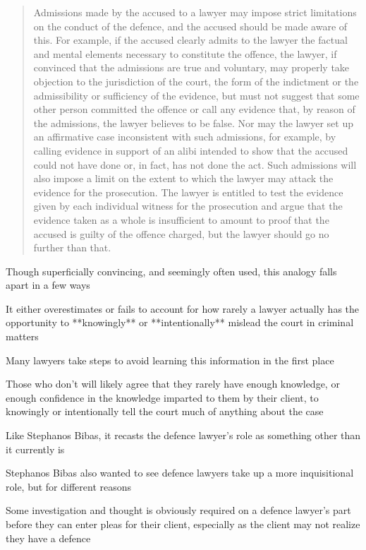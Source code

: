 \begin{quote}
    Admissions made by the accused to a lawyer may impose strict limitations on the conduct of the defence, and the accused should be made aware of this. For example, if the accused clearly admits to the lawyer the factual and mental elements necessary to constitute the offence, the lawyer, if convinced that the admissions are true and voluntary, may properly take objection to the jurisdiction of the court, the form of the indictment or the admissibility or sufficiency of the evidence, but must not suggest that some other person committed the offence or call any evidence that, by reason of the admissions, the lawyer believes to be false. Nor may the lawyer set up an affirmative case inconsistent with such admissions, for example, by calling evidence in support of an alibi intended to show that the accused could not have done or, in fact, has not done the act. Such admissions will also impose a limit on the extent to which the lawyer may attack the evidence for the prosecution. The lawyer is entitled to test the evidence given by each individual witness for the prosecution and argue that the evidence taken as a whole is insufficient to amount to proof that the accused is guilty of the offence charged, but the lawyer should go no further than that.
\end{quote}

Though superficially convincing, and seemingly often used, this analogy falls apart in a few ways

It either overestimates or fails to account for how rarely a lawyer actually has the opportunity to **knowingly** or **intentionally** mislead the court in criminal matters

Many lawyers take steps to avoid learning this information in the first place

Those who don't will likely agree that they rarely have enough knowledge, or enough confidence in the knowledge imparted to them by their client, to knowingly or intentionally tell the court much of anything about the case

Like Stephanos Bibas, it recasts the defence lawyer's role as something other than it currently is

Stephanos Bibas also wanted to see defence lawyers take up a more inquisitional role, but for different reasons

Some investigation and thought is obviously required on a defence lawyer's part before they can enter pleas for their client, especially as the client may not realize they have a defence

